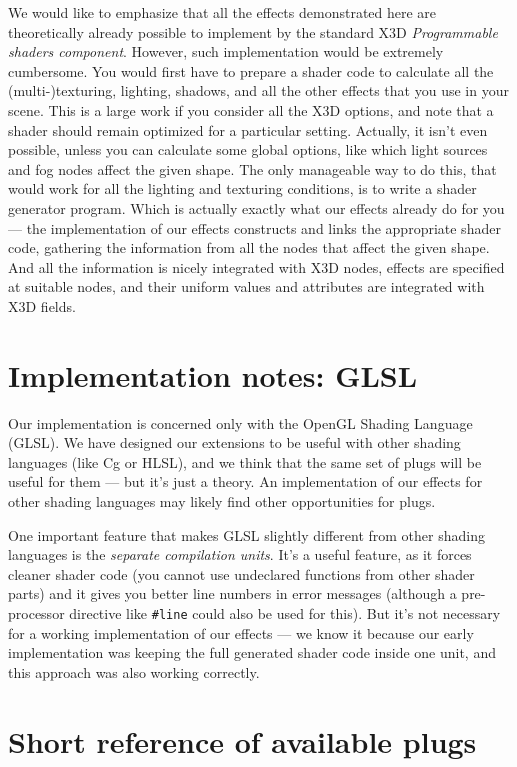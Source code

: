 \documentclass{acmsiggraph}                     %
\begin{document}
We would like to emphasize that all the effects demonstrated here
are theoretically already possible to implement by the standard
X3D \textit{Programmable shaders component}. However, such implementation
would be extremely cumbersome.
You would first have to prepare a shader code to calculate all
the (multi-)texturing, lighting,
shadows, and all the other effects that you use in your scene.
This is a large work if you consider all the X3D options, and note that
a shader should remain optimized for a particular setting.
Actually, it isn't even possible, unless you can calculate some global options,
like which light sources and fog nodes affect the given shape.
The only manageable way to do this, that would work for all the lighting
and texturing conditions, is to write a shader generator program.
Which is actually exactly what our effects already do for you ---
the implementation of our effects constructs and links
the appropriate shader code, gathering the information from all the nodes
that affect the given shape. And all the information is nicely integrated
with X3D nodes, effects are specified at suitable nodes, and their
uniform values and attributes are integrated with X3D fields.

\section{Implementation notes: GLSL}

Our implementation is concerned only with the OpenGL Shading Language
(GLSL). We have designed our extensions to be useful with other
shading languages (like Cg or HLSL), and we think that the same set of
plugs will be useful for them --- but it's just a theory. An
implementation of our effects for other shading languages may likely
find other opportunities for plugs.

One important feature that makes GLSL slightly different from other
shading languages is the \emph{separate compilation units}.
It's a useful feature, as it forces
cleaner shader code (you cannot use undeclared functions from other
shader parts) and it gives you better line numbers in error messages
(although a pre-processor directive like \texttt{\#line} could also be used for
this). But it's not necessary for a working implementation of our effects
--- we know it because our early implementation was keeping
the full generated shader code inside one unit, and this approach
was also working correctly.

\section{Short reference of available plugs}
\end{document}
